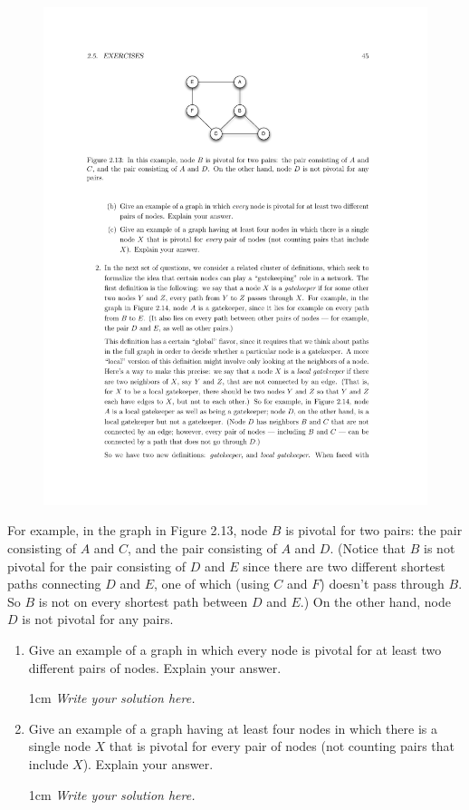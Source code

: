 \documentclass{tufte-handout}
\newcommand{\solution}[1]{
\begin{adjustwidth}{1cm}{}
\textit{\color{SolutionColor} #1}
\end{adjustwidth}}
\begin{document}
\begin{fullwidth}
\begin{figure}
    \centering
    \includegraphics{fig213.pdf}
    \label{fig:213}
\end{figure} 

For example, in the graph in Figure 2.13, node $B$ is pivotal for two pairs: the pair consisting of $A$ and $C$, and the pair consisting of $A$ and $D$. (Notice that $B$ is not pivotal for the pair consisting of $D$ and $E$ since there are two different shortest paths connecting $D$ and $E$, one of which (using $C$ and $F$) doesn't pass through $B$. So $B$ is not on every shortest path between $D$ and $E$.) On the other hand, node $D$ is not pivotal for any pairs.
\begin{enumerate}
    \item Give an example of a graph in which every node is pivotal for at least two different pairs of nodes. Explain your answer.
    \solution{
    Write your solution here.
    }
    \item Give an example of a graph having at least four nodes in which there is a single node $X$ that is pivotal for every pair of nodes (not counting pairs that include $X$). Explain your answer.
    \solution{
    Write your solution here.
    }
\end{enumerate}
\end{fullwidth}
\end{document}

